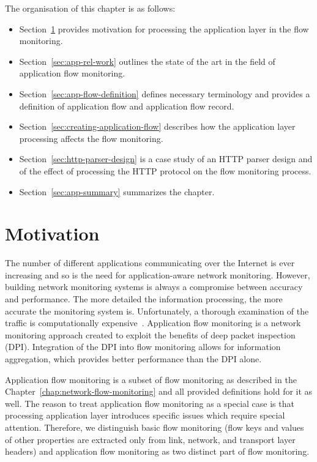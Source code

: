 \begin{chapintro}
The organisation of this chapter is as follows:
\begin{itemize}
  \item Section~\ref{sec:app-motivation} provides motivation for processing the application layer in the flow monitoring.
  \item Section~\ref{sec:app-rel-work} outlines the state of the art in the field of application flow monitoring.
  \item Section~\ref{sec:app-flow-definition} defines necessary terminology and provides a definition of application flow and application flow record.
  \item Section~\ref{sec:creating-application-flow} describes how the application layer processing affects the flow monitoring.
  \item Section~\ref{sec:http-parser-design} is a case study of an HTTP parser design and of the effect of processing the HTTP protocol on the flow monitoring process.
  \item Section~\ref{sec:app-summary} summarizes the chapter.
\end{itemize}

\end{chapintro}

\newpage


\section{Motivation}\label{sec:app-motivation}

The number of different applications communicating over the Internet is ever increasing and so is the need for application-aware network monitoring. However, building network monitoring systems is always a compromise between accuracy and performance. The more detailed the information processing, the more accurate the monitoring system is. Unfortunately, a thorough examination of the traffic is computationally expensive~\cite{Gao-2006-Efficient, Lai-2004-Parallel}. Application flow monitoring is a network monitoring approach created to exploit the benefits of deep packet inspection (DPI). Integration of the DPI into flow monitoring allows for information aggregation, which provides better performance than the DPI alone.

Application flow monitoring is a subset of flow monitoring as described in the Chapter~\ref{chap:network-flow-monitoring} and all provided definitions hold for it as well. The reason to treat application flow monitoring as a special case is that processing application layer introduces specific issues which require special attention. Therefore, we distinguish basic flow monitoring (flow keys and values of other properties are extracted only from link, network, and transport layer headers) and application flow monitoring as two distinct part of flow monitoring.

